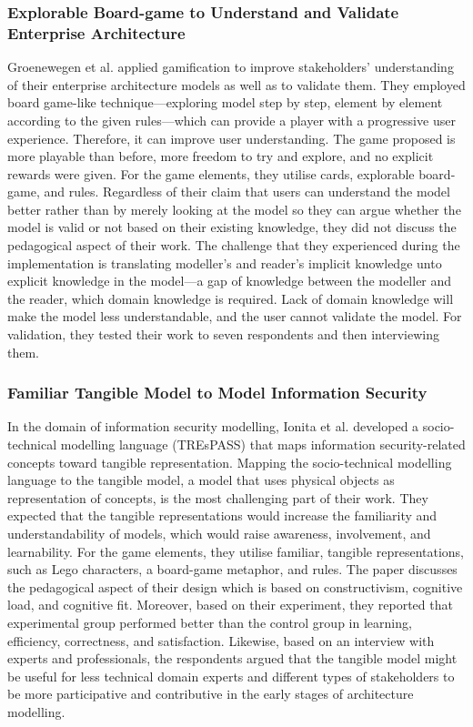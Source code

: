 \documentclass[12pt, a4paper]{report}
\begin{document}
\subsubsection{Explorable Board-game to Understand and Validate Enterprise Architecture}
Groenewegen et al. \cite{Groenewegen2010} applied gamification to improve stakeholders' understanding of their enterprise architecture models as well as to validate them. They employed board game-like technique---exploring model step by step, element by element according to the given rules---which can provide a player with a progressive user experience. Therefore, it can improve user understanding. The game proposed is more playable than before, more freedom to try and explore, and no explicit rewards were given. For the game elements, they utilise cards, explorable board-game, and rules. Regardless of their claim that users can understand the model better rather than by merely looking at the model so they can argue whether the model is valid or not based on their existing knowledge, they did not discuss the pedagogical aspect of their work. The challenge that they experienced during the implementation is translating modeller's and reader's implicit knowledge unto explicit knowledge in the model---a gap of knowledge between the modeller and the reader, which domain knowledge is required. Lack of domain knowledge will make the model less understandable, and the user cannot validate the model. For validation, they tested their work to seven respondents and then interviewing them. 

\subsubsection{Familiar Tangible Model to Model Information Security}
In the domain of information security modelling, Ionita et al.\cite{Ionita2015} developed a socio-technical modelling language (TREsPASS) that maps information security-related concepts toward tangible representation. Mapping the socio-technical modelling language to the tangible model, a model that uses physical objects as representation of concepts, is the most challenging part of their work. They expected that the tangible representations would increase the familiarity and understandability of models, which would raise awareness, involvement, and learnability. For the game elements, they utilise familiar, tangible representations, such as Lego characters, a board-game metaphor, and rules. The paper discusses the pedagogical aspect of their design which is based on constructivism, cognitive load, and cognitive fit. Moreover, based on their experiment, they reported that experimental group performed better than the control group in learning, efficiency, correctness, and satisfaction. Likewise, based on an interview with experts and professionals, the respondents argued that the tangible model might be useful for less technical domain experts and different types of stakeholders to be more participative and contributive in the early stages of architecture modelling.
\end{document}
